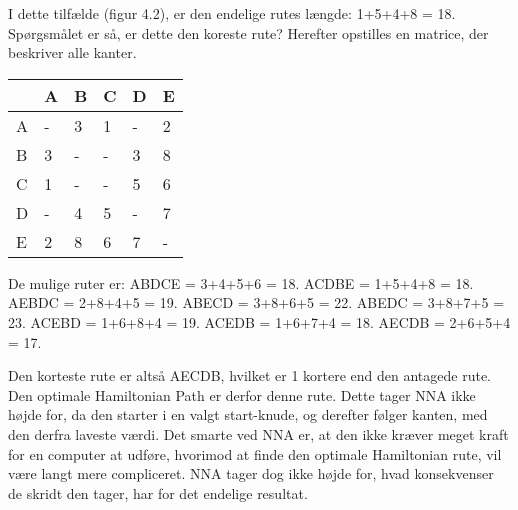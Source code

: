 I dette tilfælde (figur 4.2), er den endelige rutes længde: 1+5+4+8 = 18. Spørgsmålet er så, er dette den koreste rute? Herefter opstilles en matrice, der beskriver alle kanter.

\begin{tabular}{| l | l | l | l | l | l |}
	\hline
	  & A & B & C & D & E \\ \hline
	A & - & 3 & 1 & - & 2 \\ \hline
	B & 3 & - & - & 3 & 8 \\ \hline
	C & 1 & - & - & 5 & 6 \\ \hline
	D & - & 4 & 5 & - & 7 \\ \hline
	E & 2 & 8 & 6 & 7 & - \\
	\hline
	\end{tabular}\newline
	

De mulige ruter er: \newline
ABDCE = 3+4+5+6 = 18. \newline
ACDBE = 1+5+4+8 = 18. \newline
AEBDC = 2+8+4+5 = 19. \newline
ABECD = 3+8+6+5 = 22. \newline
ABEDC = 3+8+7+5 = 23. \newline
ACEBD = 1+6+8+4 = 19. \newline
ACEDB = 1+6+7+4 = 18. \newline
AECDB = 2+6+5+4 = 17. \newline

Den korteste rute er altså AECDB, hvilket er 1 kortere end den antagede rute. Den optimale Hamiltonian Path er derfor denne rute. Dette tager NNA ikke højde for, da den starter i en valgt start-knude, og derefter følger kanten, med den derfra laveste værdi. Det smarte ved NNA er, at den ikke kræver meget kraft for en computer at udføre, hvorimod at finde den optimale Hamiltonian rute, vil være langt mere compliceret. NNA tager dog ikke højde for, hvad konsekvenser de skridt den tager, har for det endelige resultat.

